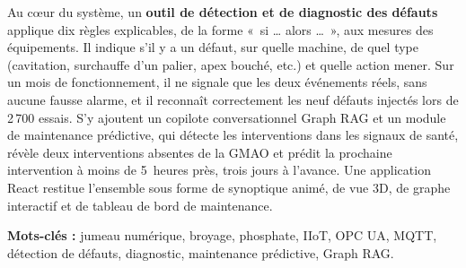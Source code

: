 Au cœur du système, un \textbf{outil de détection et de diagnostic des défauts} applique dix règles explicables, de la forme «~si … alors …~», aux mesures des équipements. Il indique s'il y a un défaut, sur quelle machine, de quel type (cavitation, surchauffe d'un palier, apex bouché, etc.) et quelle action mener. Sur un mois de fonctionnement, il ne signale que les deux événements réels, sans aucune fausse alarme, et il reconnaît correctement les neuf défauts injectés lors de 2\,700 essais. S'y ajoutent un copilote conversationnel Graph RAG et un module de maintenance prédictive, qui détecte les interventions dans les signaux de santé, révèle deux interventions absentes de la GMAO et prédit la prochaine intervention à moins de 5~heures près, trois jours à l'avance. Une application React restitue l'ensemble sous forme de synoptique animé, de vue 3D, de graphe interactif et de tableau de bord de maintenance.

\medskip
\noindent\textbf{Mots-clés :} jumeau numérique, broyage, phosphate, IIoT, OPC UA, MQTT, détection de défauts, diagnostic, maintenance prédictive, Graph RAG.


